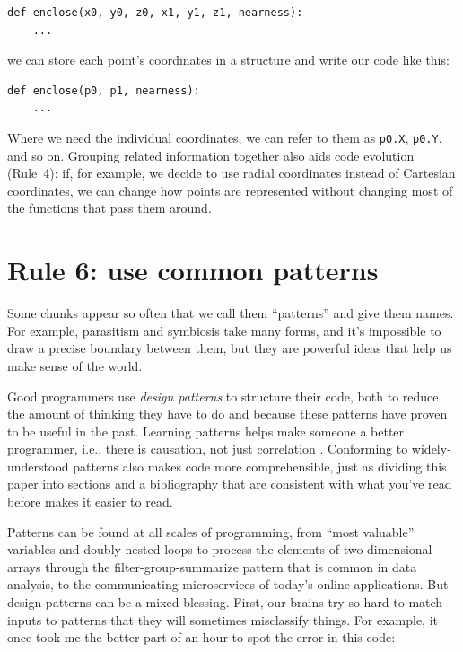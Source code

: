 \documentclass[10pt,letterpaper]{article}
\begin{document}
\begin{verbatim}
def enclose(x0, y0, z0, x1, y1, z1, nearness):
    ...
\end{verbatim}

\noindent
we can store each point's coordinates in a structure
and write our code like this:

\begin{verbatim}
def enclose(p0, p1, nearness):
    ...
\end{verbatim}

\noindent
Where we need the individual coordinates,
we can refer to them as \texttt{p0.X}, \texttt{p0.Y}, and so on.
Grouping related information together also aids code evolution (Rule~4):
if, for example, we decide to use radial coordinates instead of Cartesian coordinates,
we can change how points are represented without changing most of the functions that pass them around.

\section*{Rule 6: use common patterns}

Some chunks appear so often that we call them ``patterns'' and give them names.
For example,
parasitism and symbiosis take many forms,
and it's impossible to draw a precise boundary between them,
but they are powerful ideas that help us make sense of the world.

Good programmers use \emph{design patterns} to structure their code,
both to reduce the amount of thinking they have to do
and because these patterns have proven to be useful in the past.
Learning patterns helps make someone a better programmer,
i.e.,
there is causation, not just correlation \cite{Tichy2010}.
Conforming to widely-understood patterns also makes code more comprehensible,
just as dividing this paper into sections and a bibliography
that are consistent with what you've read before
makes it easier to read.

Patterns can be found at all scales of programming,
from ``most valuable'' variables \cite{Byckling2005}
and doubly-nested loops to process the elements of two-dimensional arrays
through the filter-group-summarize pattern that is common in data analysis,
to the communicating microservices of today's online applications.
But design patterns can be a mixed blessing.
First,
our brains try so hard to match inputs to patterns that they will sometimes misclassify things.
For example,
it once took me the better part of an hour to spot the error in this code:
\end{document}
